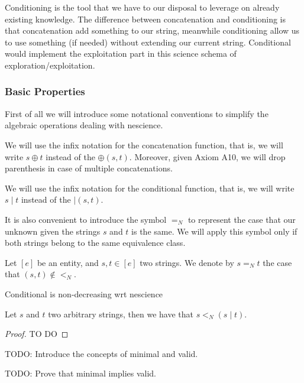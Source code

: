 Conditioning is the tool that we have to our disposal to leverage on already existing knowledge. The difference between concatenation and conditioning is that concatenation add something to our string, meanwhile conditioning allow us to use something (if needed) without extending our current string. Conditional would implement the exploitation part in this science schema of exploration/exploitation.


\subsubsection*{Basic Properties}

First of all we will introduce some notational conventions to simplify the algebraic operations dealing with nescience.

\begin{notation}
We will use the infix notation for the concatenation function, that is, we will write $s \oplus t$ instead of the $\oplus(s, t)$. Moreover, given Axiom A10, we will drop parenthesis in case of multiple concatenations.

We will use the infix notation for the conditional function, that is, we will write $s \mid t$ instead of the $\mid(s, t)$.
\end{notation}

It is also convenient to introduce the symbol $=_N$ to represent the case that our unknown given the strings $s$ and $t$ is the same. We will apply this symbol only if both strings belong to the same equivalence class.

\begin{notation}
Let $[e]$ be an entity, and $s, t \in [e]$ two strings. We denote by $ s =_N t$ the case that $(s, t) \notin <_N$.
\end{notation}

{\color{red} Conditional is non-decreasing wrt nescience}

\begin{proposition}
Let $s$ and $t$ two arbitrary strings, then we have that $s <_N (s \mid t)$.
\end{proposition}
\begin{proof}
{\color{red} TO DO}
\end{proof}

{\color{red} TODO: Introduce the concepts of minimal and valid.}

{\color{red} TODO: Prove that minimal implies valid.}


